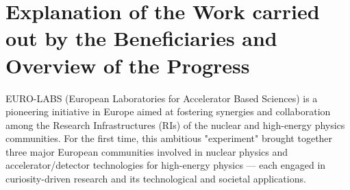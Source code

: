 
\clearpage
\section{Explanation of the Work carried out by the Beneficiaries and Overview of the Progress}
\label{sec:work-carried-out}




EURO-LABS (European Laboratories for Accelerator Based Sciences) is a pioneering initiative in Europe aimed at fostering synergies and collaboration among the Research Infrastructures (RIs) of the nuclear and high-energy physics communities. For the first time, this ambitious "experiment" brought together three major European communities involved in nuclear physics and accelerator/detector technologies for high-energy physics — each engaged in curiosity-driven research and its technological and societal applications.


